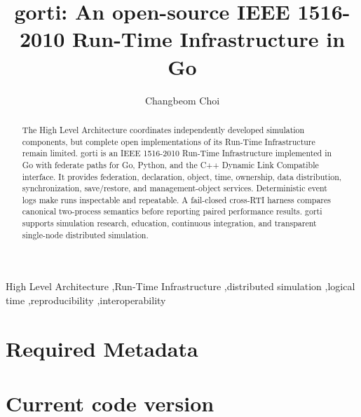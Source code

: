 \documentclass[preprint,12pt,a4paper]{elsarticle}
\begin{document}
\begin{frontmatter}

\title{gorti: An open-source IEEE 1516-2010 Run-Time Infrastructure in Go}

\author[aff1]{Changbeom Choi}
\address[aff1]{Affiliation and full postal address to be confirmed before submission}

\begin{abstract}
The High Level Architecture coordinates independently developed simulation
components, but complete open implementations of its Run-Time Infrastructure
remain limited. gorti is an IEEE 1516-2010 Run-Time Infrastructure implemented
in Go with federate paths for Go, Python, and the C++ Dynamic Link Compatible
interface. It provides federation, declaration, object, time, ownership, data
distribution, synchronization, save/restore, and management-object services.
Deterministic event logs make runs inspectable and repeatable. A fail-closed
cross-RTI harness compares canonical two-process semantics before reporting
paired performance results. gorti supports simulation research, education,
continuous integration, and transparent single-node distributed simulation.
\end{abstract}

\begin{keyword}
High Level Architecture \sep Run-Time Infrastructure \sep distributed
simulation \sep logical time \sep reproducibility \sep interoperability
\end{keyword}

\end{frontmatter}

\section*{Required Metadata}

\section*{Current code version}
\end{document}

